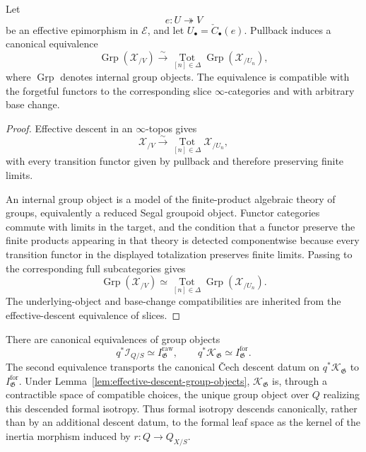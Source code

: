 \begin{lemma}
\label{lem:effective-descent-group-objects}
Let
\[
    e:U\twoheadrightarrow V
\]
be an effective epimorphism in $\mathcal E$, and let
$U_\bullet=\check C_\bullet(e)$.  Pullback induces a canonical equivalence
\[
    \operatorname{Grp}(\mathcal X_{/V})
    \xrightarrow{\sim}
    \operatorname*{Tot}_{[n]\in\Delta}
    \operatorname{Grp}(\mathcal X_{/U_n}),
\]
where $\operatorname{Grp}$ denotes internal group objects.  The equivalence is
compatible with the forgetful functors to the corresponding slice
$\infty$-categories and with arbitrary base change.
\end{lemma}

\begin{proof}
Effective descent in an $\infty$-topos gives
\[
    \mathcal X_{/V}
    \xrightarrow{\sim}
    \operatorname*{Tot}_{[n]\in\Delta}
    \mathcal X_{/U_n},
\]
with every transition functor given by pullback and therefore preserving
finite limits.

An internal group object is a model of the finite-product algebraic theory
of groups, equivalently a reduced Segal groupoid object.  Functor categories
commute with limits in the target, and the condition that a functor preserve
the finite products appearing in that theory is detected componentwise
because every transition functor in the displayed totalization preserves
finite limits.  Passing to the corresponding full subcategories gives
\[
    \operatorname{Grp}(\mathcal X_{/V})
    \simeq
    \operatorname*{Tot}_{[n]\in\Delta}
    \operatorname{Grp}(\mathcal X_{/U_n}).
\]
The underlying-object and base-change compatibilities are inherited from the
effective-descent equivalence of slices.
\end{proof}

\begin{theorem}
\label{thm:formal-isotropy-descent}
There are canonical equivalences of group objects
\[
    q^*\mathcal I_{Q/S}
    \simeq
    I^{\mathrm{raw}}_{\mathfrak G},
    \qquad
    q^*\mathcal K_{\mathfrak G}
    \simeq
    I^{\mathrm{for}}_{\mathfrak G}.
\]
The second equivalence transports the canonical \v{C}ech descent datum on
$q^*\mathcal K_{\mathfrak G}$ to
$I^{\mathrm{for}}_{\mathfrak G}$.  Under
Lemma~\ref{lem:effective-descent-group-objects},
$\mathcal K_{\mathfrak G}$ is, through a contractible space of compatible
choices, the unique group object over $Q$ realizing this descended formal
isotropy.  Thus formal isotropy descends canonically, rather than by an
additional descent datum, to the formal leaf space as the kernel of the
inertia morphism induced by
$r:Q\to Q_{X/S}$.
\end{theorem}

